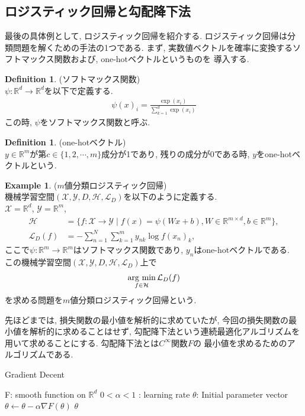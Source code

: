 \documentclass[11pt, a4paper, dvipdfmx]{jsarticle}
\theoremstyle{definition}
\newtheorem{Definition+}[Axiom+]{Definition}
\newtheorem{Example+}[Axiom+]{Example}
\newcommand{\R}{\mathbb{R}}
\newcommand{\X}{\mathcal{X}}
\newcommand{\Y}{\mathcal{Y}}
\newcommand{\Hil}{\mathcal{H}}
\newcommand{\Loss}{\mathcal{L}_{D}}
\newcommand{\MLsp}{(\X, \Y, D, \Hil, \Loss)}
\newcommand{\argmin}{\mathop{\rm arg~min}\limits}
\begin{document}
\subsection{ロジスティック回帰と勾配降下法}
最後の具体例として, ロジスティック回帰を紹介する. 
ロジスティック回帰は分類問題を解くための手法の1つである.
まず, 実数値ベクトルを確率に変換するソフトマックス関数および, one-hotベクトルというものを
導入する. 
\begin{Definition+}(ソフトマックス関数)\\
    $\psi:\R^d\to\R^d$を以下で定義する.
    \begin{align*}
        \psi(x)_{i} = \frac{\exp(x_i)}{\sum_{k = 1}^d\exp(x_i)}
    \end{align*}
    この時, $\psi$をソフトマックス関数と呼ぶ.
\end{Definition+}
\begin{Definition+}(one-hotベクトル)\\
    $y\in\R^m$が第$c\in\{1, 2, \cdots, m\}$成分が1であり, 残りの成分が0である時, 
    $y$をone-hotベクトルという.
\end{Definition+}
\begin{Example+}($m$値分類ロジスティック回帰)\\
    機械学習空間$\MLsp$を以下のように定義する.\\
    $\X=\R^d$, $\Y = \R^m$, 
    \begin{align*}
        \Hil &= \{f:\X\to\Y\mid f(x) = \psi(Wx + b), W\in\R^{m\times d}, b\in\R^m\},\\
        \Loss(f) &= -\sum_{n = 1}^{N}\sum_{k = 1}^{m}y_{nk}\log f(x_n)_{k},
    \end{align*}
    ここで$\psi:\R^m\to\R^m$はソフトマックス関数であり, $y_{n}$はone-hotベクトルである.\\
    この機械学習空間$\MLsp$上で
    \begin{align*}
        \argmin_{f\in\Hil}\Loss(f)
    \end{align*}
    を求める問題を$m$値分類ロジスティック回帰という.
\end{Example+}
先ほどまでは, 損失関数の最小値を解析的に求めていたが, 今回の損失関数の最小値を解析的に求めることはせず,
勾配降下法という連続最適化アルゴリズムを用いて求めることにする. 勾配降下法とは$C^{\infty}$関数$F$の
最小値を求めるためのアルゴリズムである.
\begin{algorithm}[H]
    \caption{Gradient Decent}
    \begin{algorithmic}
        \REQUIRE F: smooth function on $\R^{d}$
        \REQUIRE $0<\alpha<1$ : learning rate 
        \REQUIRE $\theta$: Initial parameter vector
        \STATE $\theta\leftarrow\theta - \alpha\nabla F(\theta)$ 
        \ENDWHILE
        \RETURN $\theta$
    \end{algorithmic}
\end{algorithm}
\end{document}

